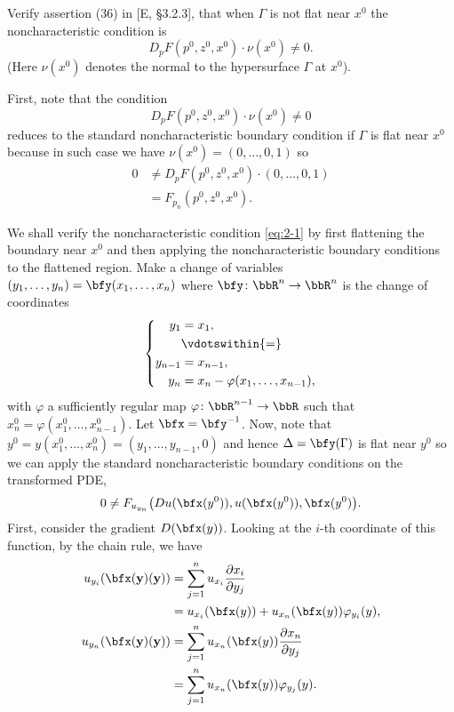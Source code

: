 \begin{problem}
  Verify assertion (36) in [E, \S 3.2.3], that when \(\Gamma\) is not flat
  near \(x^0\) the noncharacteristic condition is
  \[
    D_pF(p^0,z^0,x^0)\cdot \nu(x^0)\neq 0.
  \]
  (Here \(\nu(x^0)\) denotes the normal to the hypersurface \(\Gamma\) at
  \(x^0\)).
\end{problem}
\begin{solution}
  First, note that the condition
  \begin{equation}
    \label{eq:2-1}
    D_pF(p^0,z^0,x^0)\cdot \nu(x^0)\neq 0
  \end{equation}
  reduces to the standard noncharacteristic boundary condition if
  \(\Gamma\) is flat near \(x^0\) because in such case we have
  \(\nu(x^0)=(0,\dotsc,0,1)\) so
  \begin{align*}
    0&\neq D_pF(p^0,z^0,x^0)\cdot (0,\dotsc,0,1)\\
     &=F_{p_n}(p^0,z^0,x^0).
  \end{align*}

  We shall verify the noncharacteristic condition \eqref{eq:2-1} by first
  flattening the boundary near \(x^0\) and then applying the
  noncharacteristic boundary conditions to the flattened region. Make a
  change of variables \((y_1,\dotsc,y_n)=\bfy(x_1,\dotsc,x_n)\) where
  \(\bfy\colon\bbR^n\to\bbR^n\) is the change of coordinates
  \[
    \left\{
      \begin{aligned}
        y_1&=x_1,\\
        &\vdotswithin{=}\\
        y_{n-1}&=x_{n-1},\\
        y_n&=x_n-\varphi(x_1,\dotsc,x_{n-1}),
      \end{aligned}
    \right.
  \]
  with \(\varphi\) a sufficiently regular map
  \(\varphi\colon\bbR^{n-1}\to\bbR\) such that
  \(x_n^0=\varphi(x_1^0,\dotsc,x_{n-1}^0)\). Let \(\bfx=\bfy^{-1}\). Now,
  note that \(y^0=y(x_1^0,\dotsc,x_n^0)=(y_1,\dotsc,y_{n-1},0)\) and hence
  \(\Delta=\bfy(\Gamma)\) is flat near \(y^0\) so we can apply the standard
  noncharacteristic boundary conditions on the transformed PDE,
  \[
    0\neq F_{u_{y_n}}\bigl(Du(\bfx(y^0)),u(\bfx(y^0)),\bfx(y^0)\bigr).
  \]
  First, consider the gradient \(D(\bfx(y))\). Looking at the \(i\)-th
  coordinate of this function, by the chain rule, we have
  \begin{align*}
    u_{y_i}(\bf\bfx(y)(y))
    &=\sum_{j=1}^n u_{x_i}\frac{\partial x_i}{\partial y_j}\\
    &=u_{x_i}(\bfx(y))+u_{x_n}(\bfx(y))\varphi_{y_i}(y),\\
    u_{y_n}(\bf\bfx(y)(y))
    &=\sum_{j=1}^nu_{x_n}(\bfx(y))\frac{\partial x_n}{\partial y_j}\\
    &=\sum_{j=1}^nu_{x_n}(\bfx(y))\varphi_{y_j}(y).
  \end{align*}
\end{solution}
\newpage

